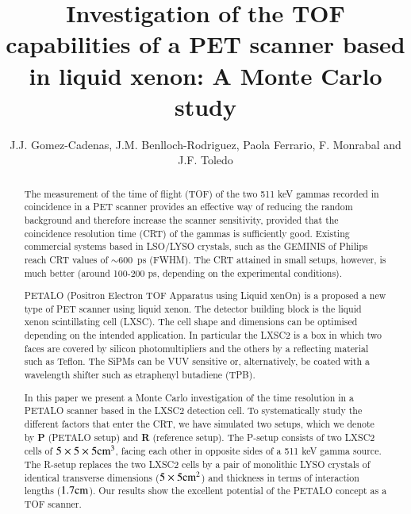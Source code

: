 \documentclass[review]{elsarticle}
\begin{document}
\begin{frontmatter}

\title{Investigation of the TOF capabilities of a PET scanner based in liquid xenon: A Monte Carlo study}


\author{J.J. Gomez-Cadenas, J.M. Benlloch-Rodriguez, Paola Ferrario, F. Monrabal and J.F. Toledo}
\address{IFIC (U. Valencia/CSIC)}

%
%

\begin{abstract}
The measurement of the time of flight (TOF) of the two 511 keV gammas recorded in coincidence in a PET scanner provides an effective way of reducing the random background and therefore increase the scanner sensitivity, provided that the coincidence resolution time (CRT) of the gammas is sufficiently good. Existing commercial systems based in LSO/LYSO crystals, such as the GEMINIS of Philips reach CRT values of 
$\sim 600$~ps (FWHM). The CRT attained in small setups, however, is much better (around 100-200 ps, depending on the experimental conditions). 

PETALO (Positron Electron TOF Apparatus using Liquid xenOn) is a proposed a new type of PET scanner using liquid xenon. The detector building block is the liquid xenon scintillating cell (LXSC). The cell shape and dimensions can be optimised depending on the intended application. In particular the LXSC2 is a box in which two faces are covered by silicon photomultipliers and the others by a reflecting material such as Teflon. The SiPMs can be VUV sensitive or, alternatively, be coated with a wavelength shifter such as etraphenyl butadiene (TPB).  

In this paper we present a Monte Carlo investigation of the time resolution
in a PETALO scanner based in the LXSC2 detection cell. To systematically study the different factors that enter the CRT, we have simulated two  setups, which we denote by {\bf P} (PETALO setup) and {\bf R} (reference setup). The P-setup consists of two LXSC2 cells of 
$5 \times 5 \times 5 {\rm cm^3}$, facing each other in opposite sides of a 511 keV gamma source. The R-setup replaces the two LXSC2 cells by a pair of  monolithic LYSO crystals of identical transverse dimensions ($5 \times 5 {\rm cm^2}$) and thickness in terms of interaction lengths ($1.7 {\rm cm}$). 
Our results show the excellent potential of the PETALO concept as a TOF scanner.   
 \end{abstract}


\end{frontmatter}
\end{document}
